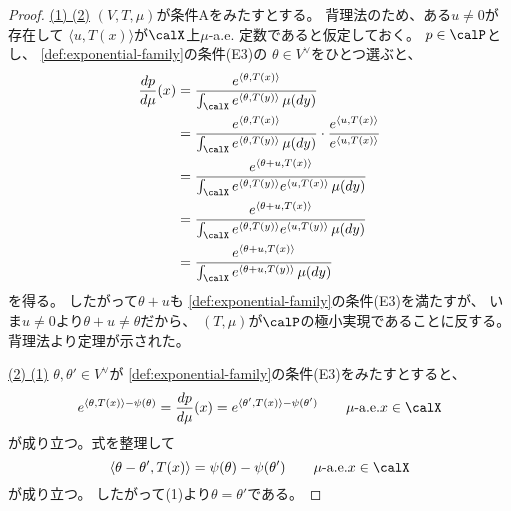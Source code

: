 \documentclass[report]{jlreq}
\begin{document}
\begin{proof}

    \uline{(1) \Rightarrow (2)} \quad
    $(V, T, \mu)$が条件Aをみたすとする。
    背理法のため、ある$u \neq 0$が存在して
    $\langle u, T(x) \rangle$が$\calX$上$\mu$-a.e. 定数であると仮定しておく。
    $p \in \calP$とし、
    \cref{def:exponential-family}の条件(E3)の
    $\theta \in V^\vee$をひとつ選ぶと、
    \begin{alignat}{1}
        \dd[p]{\mu}(x)
            &= \frac{
                e^{\langle \theta, T(x) \rangle}
            }{
                \int_{\calX} e^{\langle \theta, T(y) \rangle} \, \mu(dy)
            } \\
            &= \frac{
                e^{\langle \theta, T(x) \rangle}
            }{
                \int_{\calX} e^{\langle \theta, T(y) \rangle} \, \mu(dy)
            }
            \cdot \frac{
                e^{\langle u, T(x) \rangle}
            }{
                e^{\langle u, T(x) \rangle}
            } \\
            &= \frac{
                e^{\langle \theta + u, T(x) \rangle}
            }{
                \int_{\calX}
                e^{\langle \theta, T(y) \rangle}
                e^{\langle u, T(x) \rangle}
                \, \mu(dy)
            } \\
            &= \frac{
                e^{\langle \theta + u, T(x) \rangle}
            }{
                \int_{\calX}
                e^{\langle \theta, T(y) \rangle}
                e^{\langle u, T(y) \rangle}
                \, \mu(dy)
            } \\
            &= \frac{
                e^{\langle \theta + u, T(x) \rangle}
            }{
                \int_{\calX}
                e^{\langle \theta + u, T(y) \rangle}
                \, \mu(dy)
            }
    \end{alignat}
    を得る。
    したがって$\theta + u$も
    \cref{def:exponential-family}の条件(E3)を満たすが、
    いま$u \neq 0$より$\theta + u \neq \theta$だから、
    $(T, \mu)$が$\calP$の極小実現であることに反する。
    背理法より定理が示された。

    \uline{(2) \Rightarrow (1)} \quad
    $\theta, \theta' \in V^\vee$が
    \cref{def:exponential-family}の条件(E3)をみたすとすると、
    \begin{equation}
        e^{\langle \theta, T(x) \rangle - \psi(\theta)}
            = \dd[p]{\mu}(x)
            = e^{\langle \theta', T(x) \rangle - \psi(\theta')}
            \qquad
            \text{$\mu$-a.e.$x \in \calX$}
    \end{equation}
    が成り立つ。式を整理して
    \begin{equation}
        \langle \theta - \theta', T(x) \rangle
            = \psi(\theta) - \psi(\theta')
            \qquad
            \text{$\mu$-a.e.$x \in \calX$}
    \end{equation}
    が成り立つ。
    したがって(1)より$\theta = \theta'$である。


\end{proof}
\end{document}
